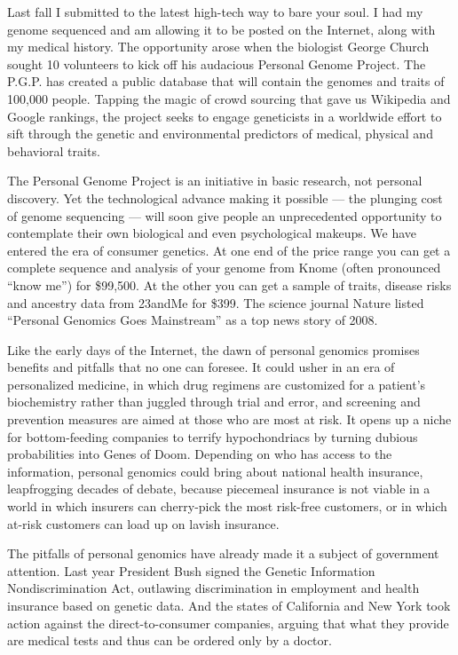 Last fall I submitted to the latest high-tech way to bare your soul. I
had my genome sequenced and am allowing it to be posted on the Internet,
along with my medical history. The opportunity arose when the biologist
George Church sought 10 volunteers to kick off his audacious Personal
Genome Project. The P.G.P. has created a public database that will
contain the genomes and traits of 100,000 people. Tapping the magic of
crowd sourcing that gave us Wikipedia and Google rankings, the project
seeks to engage geneticists in a worldwide effort to sift through the
genetic and environmental predictors of medical, physical and behavioral
traits.

The Personal Genome Project is an initiative in basic research, not
personal discovery. Yet the technological advance making it possible ---
the plunging cost of genome sequencing --- will soon give people an
unprecedented opportunity to contemplate their own biological and even
psychological makeups. We have entered the era of consumer genetics. At
one end of the price range you can get a complete sequence and analysis
of your genome from Knome (often pronounced ``know me'') for \$99,500.
At the other you can get a sample of traits, disease risks and ancestry
data from 23andMe for \$399. The science journal Nature listed
``Personal Genomics Goes Mainstream'' as a top news story of 2008.

Like the early days of the Internet, the dawn of personal genomics
promises benefits and pitfalls that no one can foresee. It could usher
in an era of personalized medicine, in which drug regimens are
customized for a patient's biochemistry rather than juggled through
trial and error, and screening and prevention measures are aimed at
those who are most at risk. It opens up a niche for bottom-feeding
companies to terrify hypochondriacs by turning dubious probabilities
into Genes of Doom. Depending on who has access to the information,
personal genomics could bring about national health insurance,
leapfrogging decades of debate, because piecemeal insurance is not
viable in a world in which insurers can cherry-pick the most risk-free
customers, or in which at-risk customers can load up on lavish
insurance.

The pitfalls of personal genomics have already made it a subject of
government attention. Last year President Bush signed the Genetic
Information Nondiscrimination Act, outlawing discrimination in
employment and health insurance based on genetic data. And the states of
California and New York took action against the direct-to-consumer
companies, arguing that what they provide are medical tests and thus can
be ordered only by a doctor.

